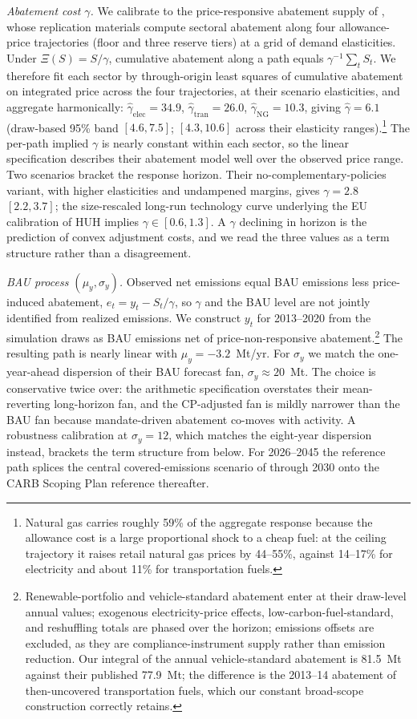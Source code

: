 \documentclass[11pt,letterpaper]{article}
\theoremstyle{plain}
\theoremstyle{definition}
\numberwithin{equation}{section}
\begin{document}
\emph{Abatement cost $\gamma$.} We calibrate to the price-responsive abatement supply of \citet{borenstein2019}, whose replication materials compute sectoral abatement along four allowance-price trajectories (floor and three reserve tiers) at a grid of demand elasticities. Under $\Xi(S)=S/\gamma$, cumulative abatement along a path equals $\gamma^{-1}\sum_t S_t$. We therefore fit each sector by through-origin least squares of cumulative abatement on integrated price across the four trajectories, at their scenario elasticities, and aggregate harmonically: $\hat\gamma_{\mathrm{elec}}=34.9$, $\hat\gamma_{\mathrm{tran}}=26.0$, $\hat\gamma_{\mathrm{NG}}=10.3$, giving $\hat\gamma=6.1$ (draw-based 95\% band $[4.6,7.5]$; $[4.3,10.6]$ across their elasticity ranges).\footnote{Natural gas carries roughly 59\% of the aggregate response because the allowance cost is a large proportional shock to a cheap fuel: at the ceiling trajectory it raises retail natural gas prices by 44--55\%, against 14--17\% for electricity and about 11\% for transportation fuels.} The per-path implied $\gamma$ is nearly constant within each sector, so the linear specification describes their abatement model well over the observed price range. Two scenarios bracket the response horizon. Their no-complementary-policies variant, with higher elasticities and undampened margins, gives $\gamma=2.8$ $[2.2,3.7]$; the size-rescaled long-run technology curve underlying the EU calibration of HUH implies $\gamma\in[0.6,1.3]$. A $\gamma$ declining in horizon is the prediction of convex adjustment costs, and we read the three values as a term structure rather than a disagreement.
 
\emph{BAU process $(\mu_y,\sigma_y)$.} Observed net emissions equal BAU emissions less price-induced abatement, $e_t = y_t - S_t/\gamma$, so $\gamma$ and the BAU level are not jointly identified from realized emissions. We construct $y_t$ for 2013--2020 from the \citet{borenstein2019} simulation draws as BAU emissions net of price-non-responsive abatement.\footnote{Renewable-portfolio and vehicle-standard abatement enter at their draw-level annual values; exogenous electricity-price effects, low-carbon-fuel-standard, and reshuffling totals are phased over the horizon; emissions offsets are excluded, as they are compliance-instrument supply rather than emission reduction. Our integral of the annual vehicle-standard abatement is 81.5~Mt against their published 77.9~Mt; the difference is the 2013--14 abatement of then-uncovered transportation fuels, which our constant broad-scope construction correctly retains.} The resulting path is nearly linear with $\mu_y=-3.2$~Mt/yr. For $\sigma_y$ we match the one-year-ahead dispersion of their BAU forecast fan, $\sigma_y\approx20$~Mt. The choice is conservative twice over: the arithmetic specification overstates their mean-reverting long-horizon fan, and the CP-adjusted fan is mildly narrower than the BAU fan because mandate-driven abatement co-moves with activity. A robustness calibration at $\sigma_y=12$, which matches the eight-year dispersion instead, brackets the term structure from below. For 2026--2045 the reference path splices the central covered-emissions scenario of \citet{inman2020} through 2030 onto the CARB Scoping Plan reference thereafter.
\end{document}
